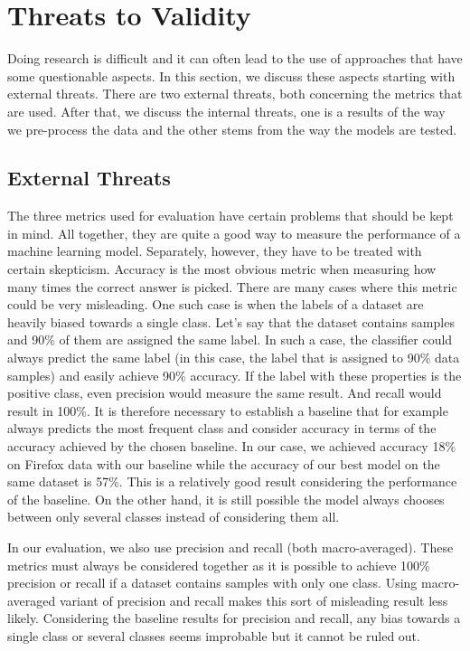 \section{Threats to Validity}

Doing research is difficult and it can often lead to the use of approaches that have some questionable aspects. In this section, we discuss these aspects starting with external threats. There are two external threats, both concerning the metrics that are used. After that, we discuss the internal threats, one is a results of the way we pre-process the data and the other stems from the way the models are tested.

\subsection{External Threats}

The three metrics used for evaluation have certain problems that should be kept in mind. All together, they are quite a good way to measure the performance of a machine learning model. Separately, however, they have to be treated with certain skepticism. Accuracy is the most obvious metric when measuring how many times the correct answer is picked. There are many cases where this metric could be very misleading. One such case is when the labels of a dataset are heavily biased towards a single class. Let's say that the dataset contains samples and 90\% of them are assigned the same label. In such a case, the classifier could always predict the same label (in this case, the label that is assigned to 90\% data samples) and easily achieve 90\% accuracy. If the label with these properties is the positive class, even precision would measure the same result. And recall would result in 100\%. It is therefore necessary to establish a baseline that for example always predicts the most frequent class and consider accuracy in terms of the accuracy achieved by the chosen baseline. In our case, we achieved accuracy 18\% on Firefox data with our baseline while the accuracy of our best model on the same dataset is 57\%. This is a relatively good result considering the performance of the baseline. On the other hand, it is still possible the model always chooses between only several classes instead of considering them all. 

In our evaluation, we also use precision and recall (both macro-averaged). These metrics must always be considered together as it is possible to achieve 100\% precision or recall if a dataset contains samples with only one class. Using macro-averaged variant of precision and recall makes this sort of misleading result less likely. Considering the baseline results for precision and recall, any bias towards a single class or several classes seems improbable but it cannot be ruled out.

